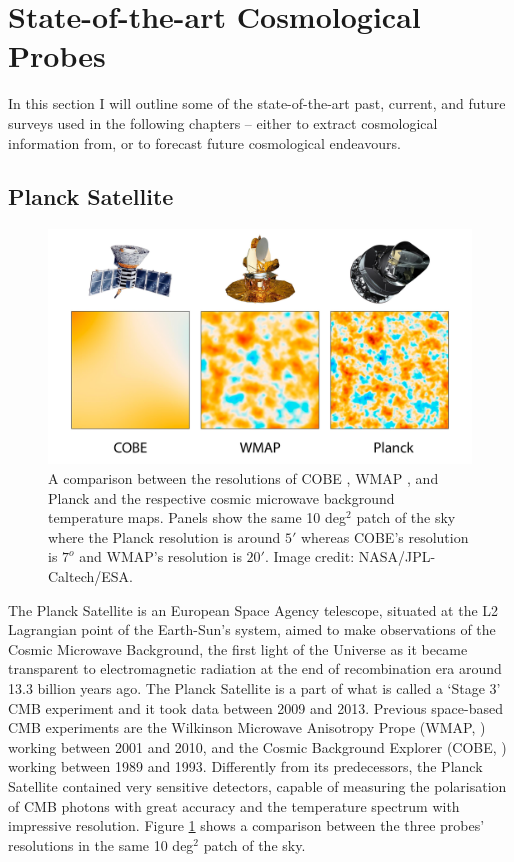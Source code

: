 \section{State-of-the-art Cosmological Probes}\label{sec:intro:probes}
In this section I will outline some of the state-of-the-art past, current, and future surveys used in the following chapters -- either to extract cosmological information from, or to forecast future cosmological endeavours.

\subsection{Planck Satellite}
\begin{figure}
\begin{center}
\includegraphics[width=\textwidth]{Intro-FIGS/planck_wmap_cobe.jpg}
\caption[A comparison between three generations of space CMB experiments. Image credit: NASA/JPL-Caltech/ESA.]{A comparison between the resolutions of COBE \citep{COBE}, WMAP \citep{WMAP_MapsResults}, and Planck \citep{planck2013} and the respective cosmic microwave background temperature maps. Panels show the same 10 deg$^2$ patch of the sky where the Planck resolution is around $5'$ whereas COBE's resolution is $7^o$ and WMAP's resolution is $20'$. Image credit: NASA/JPL-Caltech/ESA.}
\label{fig:PlanckWMAPCOBE}
\end{center}
\end{figure}
The Planck Satellite \citep{planck2013} is an European Space Agency telescope, situated at the L2 Lagrangian point of the Earth-Sun's system, aimed to make observations of the Cosmic Microwave Background, the first light of the Universe as it became transparent to electromagnetic radiation at the end of recombination era around 13.3 billion years ago. The Planck Satellite is a part of what is called a `Stage 3' CMB experiment and it took data between 2009 and 2013. Previous space-based CMB experiments are the Wilkinson Microwave Anisotropy Prope (WMAP, \citealt{WMAP_MapsResults}) working between 2001 and 2010, and the Cosmic Background Explorer (COBE, \citealt{COBE}) working between 1989 and 1993. Differently from its predecessors, the Planck Satellite contained very sensitive detectors, capable of measuring the polarisation of CMB photons with great accuracy and the temperature spectrum with impressive resolution. Figure \ref{fig:PlanckWMAPCOBE} shows a comparison between the three probes' resolutions in the same 10 deg$^2$ patch of the sky.


